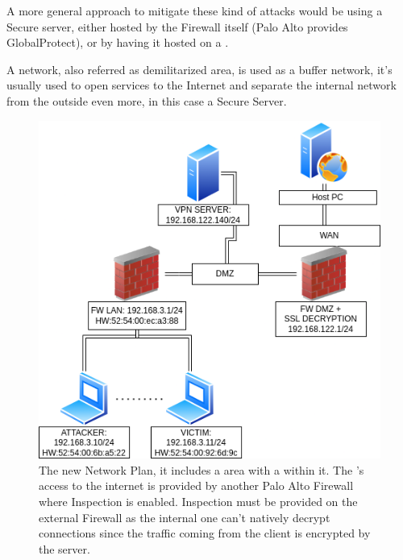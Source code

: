 A more general approach to mitigate these kind of attacks would be using a Secure  server, either hosted by the Firewall itself (Palo Alto provides GlobalProtect), or by having it hosted on a .

A  network, also referred as demilitarized area, is used as a buffer network, it's usually used to open services to the Internet and separate the internal network from the outside even more, in this case a Secure  Server.

\begin{figure}[h!]
 \centering
 \includegraphics[width=13.5cm]{img/Network_Plan_DMZ.png}
 \caption{The new Network Plan, it includes a  area with a  within it. The 's access to the internet is provided by another Palo Alto Firewall where  Inspection is enabled.  Inspection must be provided on the external Firewall as the internal one can't natively decrypt  connections since the traffic coming from the client is encrypted by the  server.}
 \label{fig: Network Plan DMZ}
\end{figure}

\newpage

